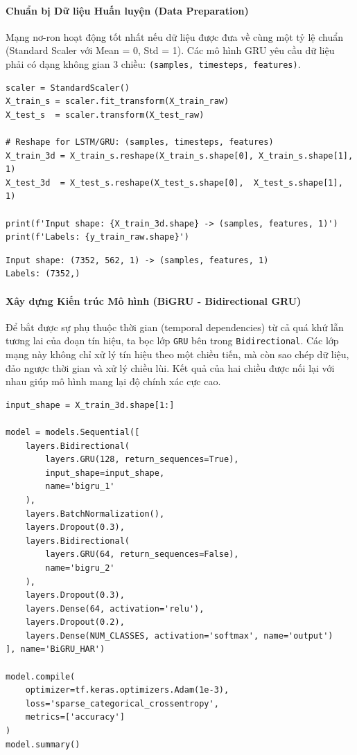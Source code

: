 \paragraph{Chuẩn bị Dữ liệu Huấn luyện (Data Preparation)} \hfill\mbox{}

Mạng nơ-ron hoạt động tốt nhất nếu dữ liệu được đưa về cùng một tỷ lệ chuẩn (Standard Scaler với Mean = 0, Std = 1). Các mô hình GRU yêu cầu dữ liệu phải có dạng không gian 3 chiều: \texttt{(samples, timesteps, features)}.

\begin{lstlisting}[style=pythoncode, caption={Chuẩn hóa (Scale) dữ liệu và biến đổi Reshape 3D}]
scaler = StandardScaler()
X_train_s = scaler.fit_transform(X_train_raw)
X_test_s  = scaler.transform(X_test_raw)

# Reshape for LSTM/GRU: (samples, timesteps, features)
X_train_3d = X_train_s.reshape(X_train_s.shape[0], X_train_s.shape[1], 1)
X_test_3d  = X_test_s.reshape(X_test_s.shape[0],  X_test_s.shape[1],  1)

print(f'Input shape: {X_train_3d.shape} -> (samples, features, 1)')
print(f'Labels: {y_train_raw.shape}')
\end{lstlisting}

\begin{lstlisting}[style=consoleoutput, caption={Output: Kích thước dữ liệu đầu vào mô hình}]
Input shape: (7352, 562, 1) -> (samples, features, 1)
Labels: (7352,)
\end{lstlisting}

\paragraph{Xây dựng Kiến trúc Mô hình (BiGRU - Bidirectional GRU)} \hfill\mbox{}

Để bắt được sự phụ thuộc thời gian (temporal dependencies) từ cả quá khứ lẫn tương lai của đoạn tín hiệu, ta bọc lớp \texttt{GRU} bên trong \texttt{Bidirectional}. Các lớp mạng này không chỉ xử lý tín hiệu theo một chiều tiến, mà còn sao chép dữ liệu, đảo ngược thời gian và xử lý chiều lùi. Kết quả của hai chiều được nối lại với nhau giúp mô hình mang lại độ chính xác cực cao.

\begin{lstlisting}[style=pythoncode, caption={Khởi tạo mô hình BiGRU}]
input_shape = X_train_3d.shape[1:]

model = models.Sequential([
    layers.Bidirectional(
        layers.GRU(128, return_sequences=True),
        input_shape=input_shape,
        name='bigru_1'
    ),
    layers.BatchNormalization(),
    layers.Dropout(0.3),
    layers.Bidirectional(
        layers.GRU(64, return_sequences=False),
        name='bigru_2'
    ),
    layers.Dropout(0.3),
    layers.Dense(64, activation='relu'),
    layers.Dropout(0.2),
    layers.Dense(NUM_CLASSES, activation='softmax', name='output')
], name='BiGRU_HAR')

model.compile(
    optimizer=tf.keras.optimizers.Adam(1e-3),
    loss='sparse_categorical_crossentropy',
    metrics=['accuracy']
)
model.summary()
\end{lstlisting}

